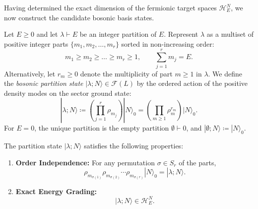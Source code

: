 Having determined the exact dimension of the fermionic target spaces $\mathcal{H}^N_E$, we now construct the candidate bosonic basis states.

\begin{definition}
Let $E \ge 0$ and let $\lambda \vdash E$ be an integer partition of $E$. Represent $\lambda$ as a multiset of positive integer parts $\{m_1, m_2, \dots, m_r\}$ sorted in non-increasing order:
\begin{equation}
m_1 \ge m_2 \ge \dots \ge m_r \ge 1, \qquad \sum_{j=1}^r m_j = E.
\end{equation}
Alternatively, let $r_m \ge 0$ denote the multiplicity of part $m \ge 1$ in $\lambda$.
We define the \emph{bosonic partition state} $|\lambda; N\rangle \in \mathcal{F}(L)$ by the ordered action of the positive density modes on the sector ground state:
\begin{equation}
|\lambda; N\rangle \coloneqq \left( \prod_{j=1}^r \rho_{m_j} \right) |N\rangle_0 = \left( \prod_{m \ge 1} \rho_m^{r_m} \right) |N\rangle_0.
\end{equation}
For $E = 0$, the unique partition is the empty partition $\emptyset \vdash 0$, and $|\emptyset; N\rangle \coloneqq |N\rangle_0$.
\end{definition}

\begin{lemma}
\label{lem:partition_state_well_defined}
The partition state $|\lambda; N\rangle$ satisfies the following properties:
\begin{enumerate}
    \item \textbf{Order Independence:} For any permutation $\sigma \in S_r$ of the parts,
    \begin{equation}
    \rho_{m_{\sigma(1)}} \rho_{m_{\sigma(2)}} \cdots \rho_{m_{\sigma(r)}} |N\rangle_0 = |\lambda; N\rangle.
    \end{equation}
    \item \textbf{Exact Energy Grading:}
    \begin{equation}
    |\lambda; N\rangle \in \mathcal{H}^N_E.
    \end{equation}
\end{enumerate}
\end{lemma}

